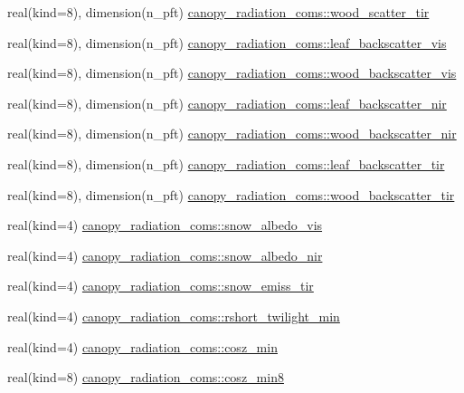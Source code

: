 \begin{DoxyCompactItemize}
\item 
real(kind=8), dimension(n\+\_\+pft) \hyperlink{namespacecanopy__radiation__coms_a12d5a36e73bfb817a8e507e98b6e91ee}{canopy\+\_\+radiation\+\_\+coms\+::wood\+\_\+scatter\+\_\+tir}
\item 
real(kind=8), dimension(n\+\_\+pft) \hyperlink{namespacecanopy__radiation__coms_a8cd51ee75d68dd0a955f06421a558c5d}{canopy\+\_\+radiation\+\_\+coms\+::leaf\+\_\+backscatter\+\_\+vis}
\item 
real(kind=8), dimension(n\+\_\+pft) \hyperlink{namespacecanopy__radiation__coms_a8fa916f5cdac8472a33b13b73dfc2745}{canopy\+\_\+radiation\+\_\+coms\+::wood\+\_\+backscatter\+\_\+vis}
\item 
real(kind=8), dimension(n\+\_\+pft) \hyperlink{namespacecanopy__radiation__coms_a75268e30022c7434bebd2e83c785e0ee}{canopy\+\_\+radiation\+\_\+coms\+::leaf\+\_\+backscatter\+\_\+nir}
\item 
real(kind=8), dimension(n\+\_\+pft) \hyperlink{namespacecanopy__radiation__coms_af78ebf7d715955c43ea9bdf6dd48dd1d}{canopy\+\_\+radiation\+\_\+coms\+::wood\+\_\+backscatter\+\_\+nir}
\item 
real(kind=8), dimension(n\+\_\+pft) \hyperlink{namespacecanopy__radiation__coms_a04c8cd0c8fb5db0488f313482b6f532d}{canopy\+\_\+radiation\+\_\+coms\+::leaf\+\_\+backscatter\+\_\+tir}
\item 
real(kind=8), dimension(n\+\_\+pft) \hyperlink{namespacecanopy__radiation__coms_abd52ebed6eef6a200b0f0635d02910fe}{canopy\+\_\+radiation\+\_\+coms\+::wood\+\_\+backscatter\+\_\+tir}
\item 
real(kind=4) \hyperlink{namespacecanopy__radiation__coms_a1cc8ec955321a89af09a5000f559027a}{canopy\+\_\+radiation\+\_\+coms\+::snow\+\_\+albedo\+\_\+vis}
\item 
real(kind=4) \hyperlink{namespacecanopy__radiation__coms_a6e9ba20bb9e4cdec42f508154e237a0d}{canopy\+\_\+radiation\+\_\+coms\+::snow\+\_\+albedo\+\_\+nir}
\item 
real(kind=4) \hyperlink{namespacecanopy__radiation__coms_ad1a9ec223aca622a0fd93fe20cf980d5}{canopy\+\_\+radiation\+\_\+coms\+::snow\+\_\+emiss\+\_\+tir}
\item 
real(kind=4) \hyperlink{namespacecanopy__radiation__coms_a3a226b3cec6a97cda6b397806da31988}{canopy\+\_\+radiation\+\_\+coms\+::rshort\+\_\+twilight\+\_\+min}
\item 
real(kind=4) \hyperlink{namespacecanopy__radiation__coms_a7bcf7a71dd9f42a8d1516a4dc0588317}{canopy\+\_\+radiation\+\_\+coms\+::cosz\+\_\+min}
\item 
real(kind=8) \hyperlink{namespacecanopy__radiation__coms_ae2a63ff3c4f0ba6dfdb7efd1a865e63a}{canopy\+\_\+radiation\+\_\+coms\+::cosz\+\_\+min8}
\end{DoxyCompactItemize}
